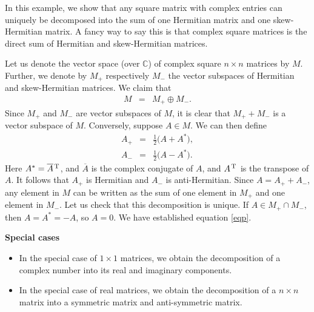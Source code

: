 \documentclass[12pt]{article}
\begin{document}
\newcommand{\ccj}[1]{\overline{#1}}
\def\dtra{\hspace{0.04cm} ^{\mbox{\scriptsize{T}}} \hspace{0.02cm}}

\newcommand{\matC}[0]{M}
\newcommand{\matCp}[0]{M_+}
\newcommand{\matCm}[0]{M_-}
 

In this example, we show that any square matrix with complex
entries can uniquely be decomposed into the sum of one Hermitian matrix and 
one skew-Hermitian matrix. A fancy way to say this is that
complex square matrices is the direct sum of Hermitian and skew-Hermitian 
matrices. 

Let us denote the vector space (over $\mathbb{C}$) of 
complex square $n\times n$ matrices by $\matC$.
Further, we denote by $\matCp$ respectively $\matCm$ the vector
subspaces of Hermitian and skew-Hermitian matrices. 
We claim that 
 \begin{eqnarray}
 \label{eqp}
 \matC &=&  \matCp  \oplus \matCm.
 \end{eqnarray}
Since $\matCp$ and $\matCm$ are vector subspaces of $\matC$, it is clear
that $\matCp +\matCm$ is a vector subspace of $\matC$. Conversely, suppose 
$A\in \matC$. We can then define
 \begin{eqnarray*}
 A_+ &=& \frac{1}{2}\big( A + A^\ast \big), \\
 A_- &=& \frac{1}{2}\big( A - A^\ast \big).
 \end{eqnarray*}
Here $A^\ast = \ccj{A}\dtra$, and $\ccj{A}$ is the complex conjugate of $A$,
and $A\dtra$ is the transpose of $A$. It follows that $A_+$ is Hermitian 
and $A_-$ is anti-Hermitian. Since $A=A_+ + A_-$, any element 
in $\matC$ can be written as
the sum of one element in $\matCp$ and one element in $\matCm$. Let us check 
that this decomposition is unique. If $A\in \matCp\cap \matCm$, then 
$A=A^\ast=-A$, so $A=0$. 
We have established equation \ref{eqp}.

{\bf Special cases}
\begin{itemize} 
\item In the special case of $1\times 1$ matrices, we obtain the 
decomposition of a complex number into its real and imaginary components. 

\item In the special case of real matrices, we obtain the decomposition of 
a $n\times n$ matrix into a symmetric matrix and anti-symmetric matrix. 

\end{itemize}
\end{document}
